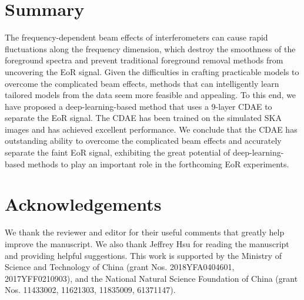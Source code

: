 \documentclass[fleqn,usenatbib]{mnras}
\newcommand{\editone}[1]{{\leavevmode\color{cyan}#1}}
\begin{document}
\section{Summary}
\label{sec:summary}

The frequency-dependent beam effects of interferometers can cause
rapid fluctuations along the frequency dimension,
which destroy the smoothness of the foreground spectra and prevent
traditional foreground removal methods from uncovering the EoR signal.
Given the difficulties in crafting practicable models to overcome the
complicated beam effects, methods that can intelligently learn tailored
models from the data seem more feasible and appealing.
To this end, we have proposed a deep-learning-based method that uses
a 9-layer CDAE to separate the EoR signal.
The CDAE has been trained on the simulated SKA images and has achieved
excellent performance.
We conclude that the CDAE has outstanding ability to overcome the
complicated beam effects and accurately separate the faint EoR signal,
exhibiting the great potential of deep-learning-based methods
to play an important role in the forthcoming EoR experiments.


\section*{Acknowledgements}

\editone{We thank the reviewer and editor for their useful comments that
greatly help improve the manuscript.}
We also thank Jeffrey Hsu for reading the manuscript and providing
helpful suggestions.
This work is supported by
the Ministry of Science and Technology of China
(grant Nos. 2018YFA0404601, 2017YFF0210903),
and the National Natural Science Foundation of China
(grant Nos. 11433002, 11621303, 11835009, 61371147).










\bsp	%
\label{lastpage}
\end{document}
